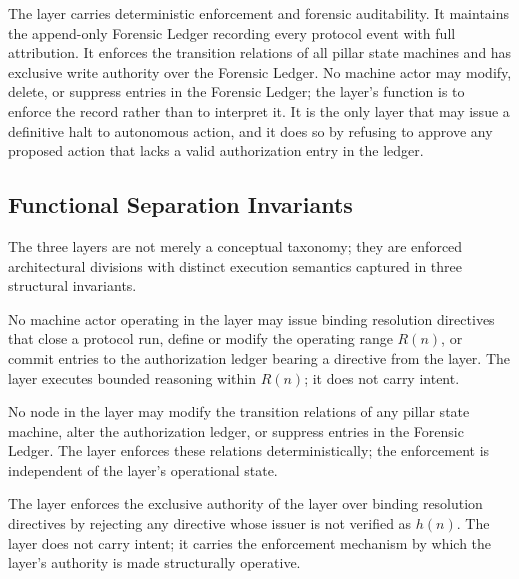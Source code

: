 The \fact{} layer carries deterministic enforcement and forensic auditability.
It maintains the append-only Forensic Ledger recording every protocol event
with full attribution.  It enforces the transition relations of all pillar
state machines and has exclusive write authority over the Forensic Ledger.  No
machine actor may modify, delete, or suppress entries in the Forensic Ledger;
the layer's function is to enforce the record rather than to interpret it.  It
is the only layer that may issue a definitive halt to autonomous action, and it
does so by refusing to approve any proposed action that lacks a valid
authorization entry in the ledger.

\subsection{Functional Separation Invariants}\label{sec:layer-invariants}

The three layers are not merely a conceptual taxonomy; they are enforced
architectural divisions with distinct execution semantics captured in three
structural invariants.

\begin{invariant}\label{inv:pb-sep}
No machine actor operating in the \bounds{} layer may issue binding resolution
directives that close a protocol run, define or modify the operating range
$R(n)$, or commit entries to the authorization ledger bearing a directive from
the \purpose{} layer.  The \bounds{} layer executes bounded reasoning within
$R(n)$; it does not carry intent.
\end{invariant}

\begin{invariant}\label{inv:bf-sep}
No node in the \bounds{} layer may modify the transition relations of any
pillar state machine, alter the authorization ledger, or suppress entries in
the Forensic Ledger.  The \fact{} layer enforces these relations
deterministically; the enforcement is independent of the \bounds{} layer's
operational state.
\end{invariant}

\begin{invariant}\label{inv:fp-converge}
The \fact{} layer enforces the exclusive authority of the \purpose{} layer
over binding resolution directives by rejecting any directive whose issuer is
not verified as $h(n)$.  The \fact{} layer does not carry intent; it carries
the enforcement mechanism by which the \purpose{} layer's authority is made
structurally operative.
\end{invariant}


